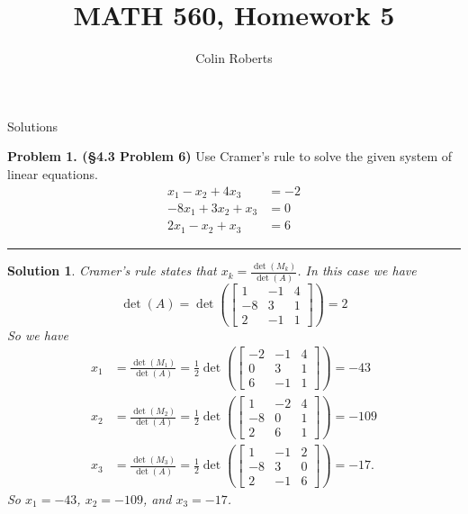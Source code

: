 \documentclass[leqno]{article}
\author{Colin Roberts}
\title{MATH 560, Homework 5}
\theoremstyle{nonumberplain}
\newtheorem{solution}{Solution}
\begin{document}
\maketitle
\begin{large}
\begin{center}
Solutions
\end{center}
\end{large}
\pagebreak

\noindent\textbf{Problem 1. (\S 4.3 Problem 6)} Use Cramer's rule to solve the given system of linear equations.
\begin{align*}
x_1-x_2+4x_3&=-2\\
-8x_1+3x_2+x_3&=0\\
2x_1-x_2+x_3&=6
\end{align*}

\noindent\rule[0.5ex]{\linewidth}{1pt}

\begin{solution}
Cramer's rule states that $x_k = \frac{\det(M_k)}{\det(A)}$.  In this case we have
\[
\det(A)=\det\left(\begin{bmatrix}
1 & -1 & 4\\
-8 & 3 & 1\\
2 & -1 & 1
\end{bmatrix}\right)=2
\]
So we have
\begin{align*}
x_1&=\frac{\det(M_1)}{\det(A)}=\frac{1}{2}\det\left(\begin{bmatrix}
-2 & -1 & 4\\
0 & 3 & 1\\
6 & -1 & 1
\end{bmatrix}\right)=-43\\
x_2&=\frac{\det(M_2)}{\det(A)}=\frac{1}{2}\det\left(\begin{bmatrix}
1 & -2 & 4\\
-8 & 0 & 1\\
2 & 6 & 1
\end{bmatrix}\right)=-109\\
x_3&=\frac{\det(M_3)}{\det(A)}=\frac{1}{2}\det\left(\begin{bmatrix}
1 & -1 & 2\\
-8 & 3 & 0\\
2 & -1 & 6
\end{bmatrix}\right)=-17.
\end{align*}
So $x_1=-43$, $x_2=-109$, and $x_3=-17$.
\end{solution}
\end{document}
